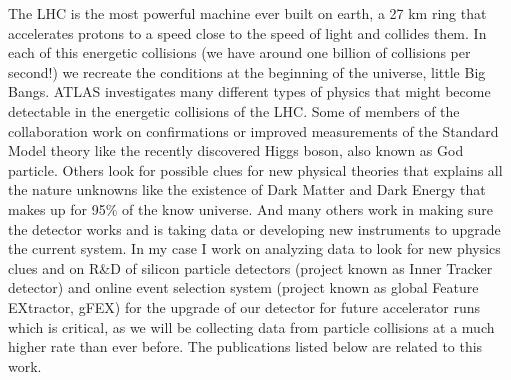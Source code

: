 \documentclass[letterpaper,10pt]{article}
\begin{document}
The LHC is the most powerful machine ever built on earth, a 27 km ring that accelerates protons to a speed close to the speed of light and collides them. In each of this energetic collisions (we have around one billion of collisions per second!) we recreate the conditions at the beginning of the universe, little Big Bangs. ATLAS investigates many different types of physics that might become detectable in the energetic collisions of the LHC. Some of members of the collaboration work on confirmations or improved measurements of the Standard Model theory like the recently discovered Higgs boson, also known as God particle. Others look for possible clues for new physical theories that explains all the nature unknowns like the existence of Dark Matter and Dark Energy that makes up for 95\% of the know universe. And many others work in making sure the detector works and is taking data or developing new instruments to upgrade the current system. In my case I work on analyzing data to look for new physics clues and on R\&D of silicon particle detectors (project known as Inner Tracker detector) and online event selection system (project known as global Feature EXtractor, gFEX) for the upgrade of our detector for future accelerator runs which is critical, as we will be collecting data from particle collisions at a much higher rate than ever before. The publications listed below are related to this work. 
\end{document}

